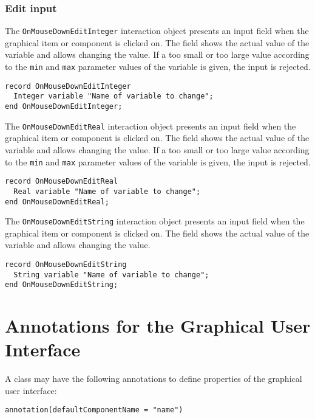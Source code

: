 \subsubsection{Edit input}\label{edit-input}

The \lstinline!OnMouseDownEditInteger! interaction object presents an input field
when the graphical item or component is clicked on. The field shows the
actual value of the variable and allows changing the value. If a too
small or too large value according to the \lstinline!min! and \lstinline!max! parameter values
of the variable is given, the input is rejected.

\begin{lstlisting}[language=modelica]
record OnMouseDownEditInteger
  Integer variable "Name of variable to change";
end OnMouseDownEditInteger;
\end{lstlisting}
The \lstinline!OnMouseDownEditReal! interaction object presents an input field when
the graphical item or component is clicked on. The field shows the
actual value of the variable and allows changing the value. If a too
small or too large value according to the \lstinline!min! and \lstinline!max! parameter values
of the variable is given, the input is rejected.

\begin{lstlisting}[language=modelica]
record OnMouseDownEditReal
  Real variable "Name of variable to change";
end OnMouseDownEditReal;
\end{lstlisting}
The \lstinline!OnMouseDownEditString! interaction object presents an input field
when the graphical item or component is clicked on. The field shows the
actual value of the variable and allows changing the value.

\begin{lstlisting}[language=modelica]
record OnMouseDownEditString
  String variable "Name of variable to change";
end OnMouseDownEditString;
\end{lstlisting}
\section{Annotations for the Graphical User Interface}\label{annotations-for-the-graphical-user-interface}

A class may have the following annotations to define properties of the
graphical user interface:
\begin{lstlisting}[language=modelica]
 annotation(defaultComponentName = "name")
\end{lstlisting}

